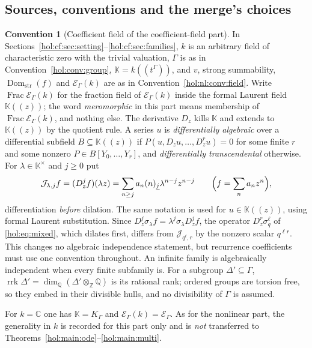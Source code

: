 \documentclass[11pt]{article}
\numberwithin{equation}{section}
\theoremstyle{definition}
\newtheorem{convention}[theorem]{Convention}
\theoremstyle{remark}
\newcommand{\C}{\mathbb C}
\newcommand{\Q}{\mathbb Q}
\newcommand{\Z}{\mathbb Z}
\newcommand{\K}{K_\Gamma}
\newcommand{\E}{\mathcal E_\Gamma}
\newcommand{\Dom}{\operatorname{Dom}_{\mathrm{str}}}
\newcommand{\fall}[2]{(#1)_{\underline{#2}}}
\newcommand{\KK}{\mathbb K}
\newcommand{\EK}{\mathcal E_\Gamma(k)}
\newcommand{\FE}{\operatorname{Frac}\EK}
\newcommand{\rrk}{\operatorname{rrk}}
\newcommand{\jet}[2]{\mathcal J_{#1,#2}}
\begin{document}
\subsection{Sources, conventions and the merge's choices}
\label{hol:cf:sub:conventions}

\begin{convention}[Coefficient field of the coefficient-field part]
\label{hol:cf:conv:field}
In Sections~\ref{hol:cf:sec:setting}--\ref{hol:cf:sec:families}, $k$ is an
arbitrary field of characteristic zero with the trivial valuation, $\Gamma$ is
as in Convention~\ref{hol:conv:group}, $\KK=k((t^\Gamma))$, and $v$, strong
summability, $\Dom(f)$ and $\EK$ are as in
Convention~\ref{hol:nl:conv:field}. Write $\FE$ for the fraction field of
$\EK$ inside the formal Laurent field $\KK((z))$; the word
\emph{meromorphic} in this part means membership of $\FE$, and nothing else.
The derivative $D_z$ kills $\KK$ and extends to $\KK((z))$ by the quotient
rule. A series $u$ is \emph{differentially algebraic} over a differential
subfield $B\subseteq\KK((z))$ if $P(u,D_zu,\ldots,D_z^ru)=0$ for some finite
$r$ and some nonzero $P\in B[Y_0,\ldots,Y_r]$, and \emph{differentially
transcendental} otherwise. For $\lambda\in\KK^\times$ and $j\ge0$ put
\begin{equation}\label{hol:cf:eq:jet}
 \jet\lambda jf=(D_z^jf)(\lambda z)
 =\sum_{n\ge j}a_n\fall nj\lambda^{n-j}z^{n-j}
 \qquad\Bigl(f=\sum_na_nz^n\Bigr),
\end{equation}
differentiation \emph{before} dilation. The same notation is used for
$u\in\KK((z))$, using formal Laurent substitution. Since
$D_z^j\sigma_\lambda f=\lambda^j\sigma_\lambda D_z^jf$, the operator
$D_z^r\sigma_q^\ell$ of \eqref{hol:eq:mixed}, which dilates first, differs from
$\jet{q^\ell}r$ by the nonzero scalar $q^{\ell r}$. This changes no algebraic
independence statement, but recurrence coefficients must use one convention
throughout. An infinite family is algebraically independent when every
finite subfamily is. For a subgroup $\Delta'\subseteq\Gamma$,
$\rrk\Delta'=\dim_\Q(\Delta'\otimes_\Z\Q)$ is its rational rank; ordered
groups are torsion free, so they embed in their divisible hulls, and no
divisibility of $\Gamma$ is assumed.
\end{convention}

For $k=\C$ one has $\KK=\K$ and $\EK=\E$. As for the nonlinear part, the
generality in $k$ is recorded for this part only and is \emph{not}
transferred to Theorems~\ref{hol:main:ode}--\ref{hol:main:multi}.
\end{document}

